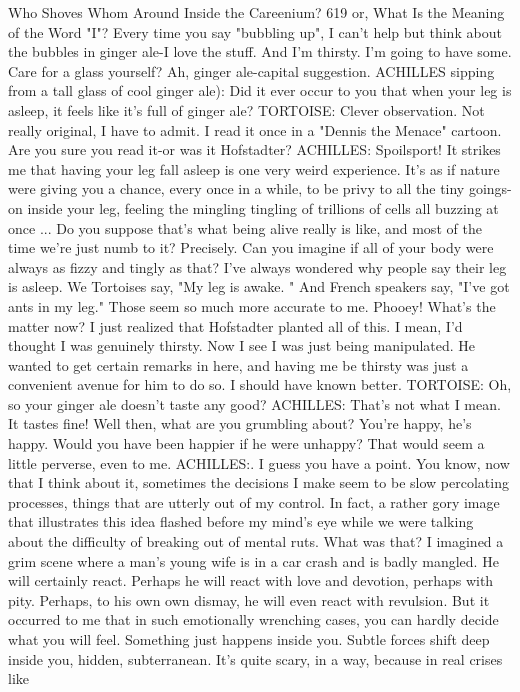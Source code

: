 Who Shoves Whom Around Inside the Careenium?                                          619
or, What Is the Meaning of the Word "I"?
\achilles Every time you say "bubbling up", I can't help but think about the
  bubbles in ginger ale-I love the stuff. And I'm thirsty. I'm going to have some. Care
  for a glass yourself?
\tortoise Ah, ginger ale-capital suggestion.
ACHILLES sipping from a tall glass of cool ginger ale): Did it ever occur to you that
  when your leg is asleep, it feels like it's full of ginger ale? TORTOISE: Clever
  observation.
\achilles Not really original, I have to admit. I read it once in a "Dennis the
  Menace" cartoon.
\tortoise Are you sure you read it-or was it Hofstadter? ACHILLES: Spoilsport!
\tortoise It strikes me that having your leg fall asleep is one very weird
  experience. It's as if nature were giving you a chance, every once in a while, to be
  privy to all the tiny goings-on inside your leg, feeling the mingling tingling of
  trillions of cells all buzzing at once ...
\achilles Do you suppose that's what being alive really is like, and most of the
  time we're just numb to it?
\tortoise Precisely. Can you imagine if all of your body were always as fizzy and
  tingly as that? I've always wondered why people say their leg is asleep. We
  Tortoises say, "My leg is awake. " And French speakers say, "I've got ants in my
  leg." Those seem so much more accurate to me.
\achilles Phooey!
\tortoise What's the matter now?
\achilles I just realized that Hofstadter planted all of this. I mean, I'd thought I
  was genuinely thirsty. Now I see I was just being manipulated. He wanted to get
  certain remarks in here, and having me be thirsty was just a convenient avenue for
  him to do so. I should have known better. TORTOISE: Oh, so your ginger ale
  doesn't taste any good? ACHILLES: That's not what I mean. It tastes fine!
\tortoise Well then, what are you grumbling about? You're happy, he's happy.
  Would you have been happier if he were unhappy? That would seem a little
  perverse, even to me.
ACHILLES:. I guess you have a point. You know, now that I think about it,
  sometimes the decisions I make seem to be slow percolating processes, things that
  are utterly out of my control. In fact, a rather gory image that illustrates this idea
  flashed before my mind's eye while we were talking about the difficulty of
  breaking out of mental ruts.
\tortoise What was that?
\achilles I imagined a grim scene where a man's young wife is in a car crash and
  is badly mangled. He will certainly react. Perhaps he will react with love and
  devotion, perhaps with pity. Perhaps, to his own own dismay, he will even react
  with revulsion. But it occurred to me that in such emotionally wrenching cases,
  you can hardly decide what you will feel. Something just happens inside you.
  Subtle forces shift deep inside you, hidden, subterranean. It's quite scary, in a way,
  because in real crises like




